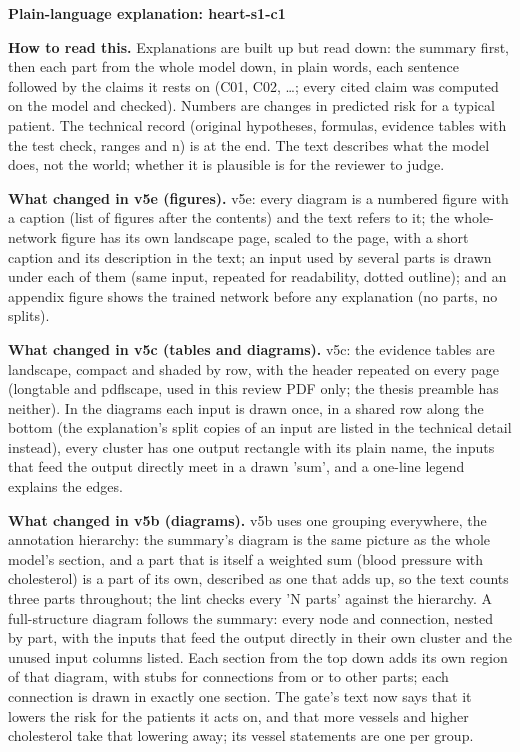 \documentclass[a4paper,10pt]{article}
\begin{document}
\begin{center}{\Large\bfseries Plain-language explanation: heart-s1-c1\par}\vspace{2mm}{\small AI-assisted drafts for review. Nothing here has been verified by a person.\par}\end{center}
\noindent\textbf{How to read this.} Explanations are built up but read down: the summary first, then each part from the whole model down, in plain words, each sentence followed by the claims it rests on (C01, C02, \ldots; every cited claim was computed on the model and checked). Numbers are changes in predicted risk for a typical patient. The technical record (original hypotheses, formulas, evidence tables with the test check, ranges and n) is at the end. The text describes what the model does, not the world; whether it is plausible is for the reviewer to judge.
\par\medskip\noindent\textbf{What changed in v5e (figures).} v5e: every diagram is a numbered figure with a caption (list of figures after the contents) and the text refers to it; the whole-network figure has its own landscape page, scaled to the page, with a short caption and its description in the text; an input used by several parts is drawn under each of them (same input, repeated for readability, dotted outline); and an appendix figure shows the trained network before any explanation (no parts, no splits).
\par\medskip\noindent\textbf{What changed in v5c (tables and diagrams).} v5c: the evidence tables are landscape, compact and shaded by row, with the header repeated on every page (longtable and pdflscape, used in this review PDF only; the thesis preamble has neither). In the diagrams each input is drawn once, in a shared row along the bottom (the explanation's split copies of an input are listed in the technical detail instead), every cluster has one output rectangle with its plain name, the inputs that feed the output directly meet in a drawn 'sum', and a one-line legend explains the edges.
\par\medskip\noindent\textbf{What changed in v5b (diagrams).} v5b uses one grouping everywhere, the annotation hierarchy: the summary's diagram is the same picture as the whole model's section, and a part that is itself a weighted sum (blood pressure with cholesterol) is a part of its own, described as one that adds up, so the text counts three parts throughout; the lint checks every 'N parts' against the hierarchy. A full-structure diagram follows the summary: every node and connection, nested by part, with the inputs that feed the output directly in their own cluster and the unused input columns listed. Each section from the top down adds its own region of that diagram, with stubs for connections from or to other parts; each connection is drawn in exactly one section. The gate's text now says that it lowers the risk for the patients it acts on, and that more vessels and higher cholesterol take that lowering away; its vessel statements are one per group.
\end{document}
